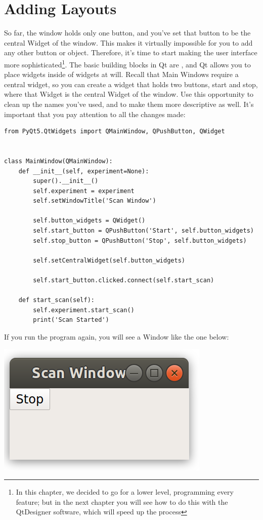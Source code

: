\section{Adding Layouts}\label{sec:adding-layouts}
So far, the window holds only one button, and you've set that button to be the central Widget of the window. This makes it virtually impossible for you to add any other button or object. Therefore, it's time to start making the user interface more sophisticated\footnote{In this chapter, we decided to go for a lower level, programming every feature; but in the next chapter you will see how to do this with the QtDesigner software, which will speed up the process}. The basic building blocks in Qt are , and Qt allows you to place widgets inside of widgets at will. Recall that Main Windows require a central widget, so you can create a widget that holds two buttons, start and stop, where that Widget is the central Widget of the window. Use this opportunity to clean up the names you've used, and to make them more descriptive as well. It's important that you pay attention to all the changes made:

\begin{verbatim}
from PyQt5.QtWidgets import QMainWindow, QPushButton, QWidget


class MainWindow(QMainWindow):
    def __init__(self, experiment=None):
        super().__init__()
        self.experiment = experiment
        self.setWindowTitle('Scan Window')

        self.button_widgets = QWidget()
        self.start_button = QPushButton('Start', self.button_widgets)
        self.stop_button = QPushButton('Stop', self.button_widgets)

        self.setCentralWidget(self.button_widgets)

        self.start_button.clicked.connect(self.start_scan)

    def start_scan(self):
        self.experiment.start_scan()
        print('Scan Started')
\end{verbatim}

If you run the program again, you will see a Window like the one below:

\begin{center}
    \includegraphics[width=.3\textwidth]{images/Chapter_08/05_window_without_layout.png}
\end{center}

